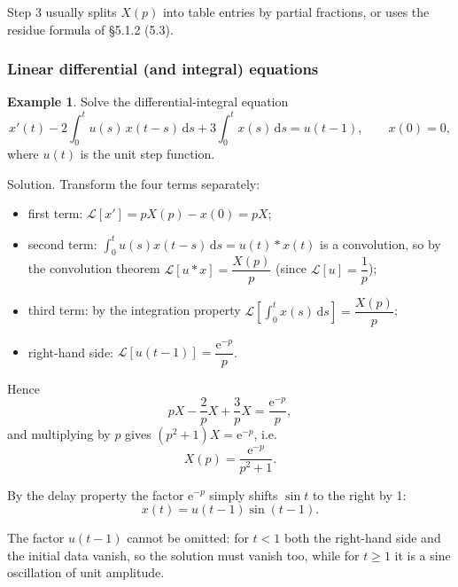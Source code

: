 \documentclass[11pt,a4paper]{article}
\theoremstyle{definition}
\newtheorem{example}{Example}[section]
\theoremstyle{plain}
\begin{document}
Step 3 usually splits $X(p)$ into table entries by partial fractions, or uses the residue formula
of \S 5.1.2 (5.3).

\subsubsection{Linear differential (and integral) equations}

\begin{example}
Solve the differential-integral equation
\begin{equation*}
x'(t)-2\int_{0}^{t}u(s)\,x(t-s)\,\mathrm{d}s+3\int_{0}^{t}x(s)\,\mathrm{d}s=u(t-1),
\qquad x(0)=0 ,
\end{equation*}
where $u(t)$ is the unit step function.
\end{example}

Solution. Transform the four terms separately:
\begin{itemize}[itemsep=2pt,topsep=3pt]
    \item first term: $\mathcal{L}\left[x'\right]=pX(p)-x(0)=pX$;
    \item second term: $\displaystyle\int_{0}^{t}u(s)x(t-s)\,\mathrm{d}s=u(t)*x(t)$ is a
          convolution, so by the convolution theorem
          $\mathcal{L}\left[u*x\right]=\dfrac{X(p)}{p}$ (since $\mathcal{L}[u]=\dfrac{1}{p}$);
    \item third term: by the integration property
          $\mathcal{L}\left[\displaystyle\int_{0}^{t}x(s)\,\mathrm{d}s\right]=\dfrac{X(p)}{p}$;
    \item right-hand side: $\mathcal{L}\left[u(t-1)\right]=\dfrac{\mathrm{e}^{-p}}{p}$.
\end{itemize}

Hence
\begin{equation*}
pX-\frac{2}{p}X+\frac{3}{p}X=\frac{\mathrm{e}^{-p}}{p},
\end{equation*}
and multiplying by $p$ gives $\left(p^2+1\right)X=\mathrm{e}^{-p}$, i.e.
\begin{equation*}
X(p)=\frac{\mathrm{e}^{-p}}{p^2+1} .
\end{equation*}

By the delay property the factor $\mathrm{e}^{-p}$ simply shifts $\sin t$ to the right by 1:
\begin{equation*}
x(t)=u(t-1)\sin(t-1).
\end{equation*}

The factor $u(t-1)$ cannot be omitted: for $t<1$ both the right-hand side and the initial data
vanish, so the solution must vanish too, while for $t\ge 1$ it is a sine oscillation of unit
amplitude.
\end{document}
